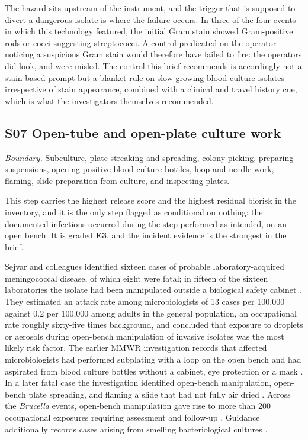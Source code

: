 The hazard sits upstream of the instrument, and the trigger that is supposed to
divert a dangerous isolate is where the failure occurs. In three of the four
events in which this technology featured, the initial Gram stain showed
Gram-positive rods or cocci suggesting streptococci. A control predicated on
the operator noticing a suspicious Gram stain would therefore have failed to
fire: the operators did look, and were misled. The control this brief
recommends is accordingly not a stain-based prompt but a blanket rule on
slow-growing blood culture isolates irrespective of stain appearance, combined
with a clinical and travel history cue, which is what the investigators
themselves recommended.

\subsection{S07 Open-tube and open-plate culture work}

\textit{Boundary.} Subculture, plate streaking and spreading, colony picking,
preparing suspensions, opening positive blood culture bottles, loop and needle
work, flaming, slide preparation from culture, and inspecting plates.

This step carries the highest release score and the highest residual biorisk in
the inventory, and it is the only step flagged as conditional on nothing: the
documented infections occurred during the step performed as intended, on an
open bench. It is graded \textbf{E3}, and the incident evidence is the
strongest in the brief.

Sejvar and colleagues identified sixteen cases of probable laboratory-acquired
meningococcal disease, of which eight were fatal; in fifteen of the sixteen
laboratories the isolate had been manipulated outside a biological safety
cabinet \cite{sejvar2005}. They estimated an attack rate among microbiologists
of 13 cases per 100,000 against 0.2 per 100,000 among adults in the general
population, an occupational rate roughly sixty-five times background, and
concluded that exposure to droplets or aerosols during open-bench manipulation
of invasive isolates was the most likely risk factor. The earlier MMWR
investigation records that affected microbiologists had performed subplating
with a loop on the open bench and had aspirated from blood culture bottles
without a cabinet, eye protection or a mask \cite{mmwr2002}. In a later fatal
case the investigation identified open-bench manipulation, open-bench plate
spreading, and flaming a slide that had not fully air dried \cite{mmwr2014}.
Across the \textit{Brucella} events, open-bench manipulation gave rise to more
than 200 occupational exposures requiring assessment and follow-up
\cite{ackelsberg2020}. Guidance additionally records cases arising from
smelling bacteriological cultures \cite{bmbl6}.

